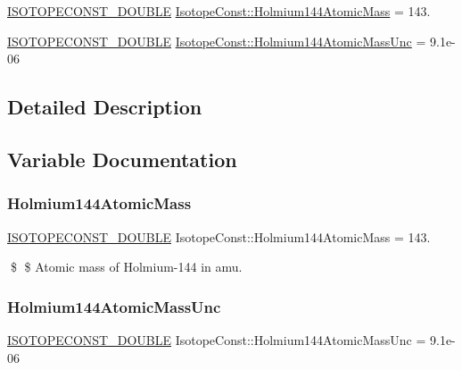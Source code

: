 \begin{DoxyCompactItemize}
\item 
\mbox{\hyperlink{group___isotope_const-_macros_ga8f45a7272ce02c0b4c65c44636ed719a}{I\+S\+O\+T\+O\+P\+E\+C\+O\+N\+S\+T\+\_\+\+D\+O\+U\+B\+LE}} \mbox{\hyperlink{group___isotope_const-_holmium-_ho144_ga25a2d773d8687a2afccb57a4b0c7afb9}{Isotope\+Const\+::\+Holmium144\+Atomic\+Mass}} = 143.
\item 
\mbox{\hyperlink{group___isotope_const-_macros_ga8f45a7272ce02c0b4c65c44636ed719a}{I\+S\+O\+T\+O\+P\+E\+C\+O\+N\+S\+T\+\_\+\+D\+O\+U\+B\+LE}} \mbox{\hyperlink{group___isotope_const-_holmium-_ho144_ga97e349e9e455ce39cd4cf4317d5c49bd}{Isotope\+Const\+::\+Holmium144\+Atomic\+Mass\+Unc}} = 9.\+1e-\/06
\end{DoxyCompactItemize}


\subsection{Detailed Description}


\subsection{Variable Documentation}
\mbox{\label{group___isotope_const-_holmium-_ho144_ga25a2d773d8687a2afccb57a4b0c7afb9}} 
\subsubsection{\texorpdfstring{Holmium144\+Atomic\+Mass}{Holmium144AtomicMass}}
{\footnotesize\ttfamily \mbox{\hyperlink{group___isotope_const-_macros_ga8f45a7272ce02c0b4c65c44636ed719a}{I\+S\+O\+T\+O\+P\+E\+C\+O\+N\+S\+T\+\_\+\+D\+O\+U\+B\+LE}} Isotope\+Const\+::\+Holmium144\+Atomic\+Mass = 143.}

\$ \$ Atomic mass of Holmium-\/144 in amu. \mbox{\label{group___isotope_const-_holmium-_ho144_ga97e349e9e455ce39cd4cf4317d5c49bd}} 
\subsubsection{\texorpdfstring{Holmium144\+Atomic\+Mass\+Unc}{Holmium144AtomicMassUnc}}
{\footnotesize\ttfamily \mbox{\hyperlink{group___isotope_const-_macros_ga8f45a7272ce02c0b4c65c44636ed719a}{I\+S\+O\+T\+O\+P\+E\+C\+O\+N\+S\+T\+\_\+\+D\+O\+U\+B\+LE}} Isotope\+Const\+::\+Holmium144\+Atomic\+Mass\+Unc = 9.\+1e-\/06}


